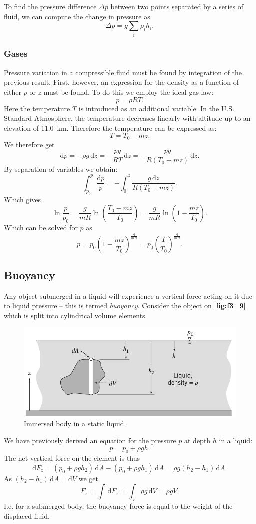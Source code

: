 To find the pressure difference $\Delta p$ between two points separated by a series of fluid, we can compute the change in pressure as
\[ 
\Delta p = g \sum_{i} \rho_i h_i 
.\]

\subsubsection{Gases}
Pressure variation in a compressible fluid must be found by integration of the previous result. First, however, an expression for the density as a function of either $p$ or $z$ must be found. To do this we employ the ideal gas law:
\[ 
p = \rho R T
.\]
Here the temperature $T$ is introduced as an additional variable. In the U.S. Standard Atmosphere, the temperature decreases linearly with altitude up to an elevation of \qty{11,0}{km}. Therefore the temperature can be expressed as:
\[ 
T = T_0 - mz
.\]
We therefore get
\[ 
\mathrm{d}p = - \rho g \, \mathrm{d}z = - \frac{pg}{RT} \, \mathrm{d}z = - \frac{pg}{R \left( T_0 - mz \right)} \, \mathrm{d}z
.\]
By separation of variables we obtain:
\[ 
\int_{p_0}^{p} \frac{\mathrm{d}p}{p}= - \int_{0}^{z} \frac{g \, \mathrm{d}z}{R \left( T_0 - mz \right)}
.\]
Which gives
\[ 
\ln \frac{p}{p_0} = \frac{g}{mR} \ln \left(  \frac{T_0 - mz}{T_0} \right) = \frac{g}{mR} \ln \left( 1 - \frac{mz}{T_0} \right)
.\]
Which can be solved for $p$ as
\[ 
p = p_0 \left( 1 - \frac{mz}{T_0} \right)^{\frac{g}{mR}} = p_0 \left( \frac{T}{T_0} \right)^{\frac{g}{mR}}
.\]

\subsection{Buoyancy}
Any object submerged in a liquid will experience a vertical force acting on it due to liquid pressure -- this is termed \textit{buoyancy}. Consider the object on \textbf{\autoref{fig:f3_9}} which is split into cylindrical volume elements.

\begin{figure} [ht]
  \centering
  \includegraphics[width=0.5\linewidth]{./figures/f3_9.png}
  \caption{Immersed body in a static liquid.}
  \label{fig:f3_9}
\end{figure}

We have previously derived an equation for the pressure $p$ at depth $h$ in a liquid:
\[ 
p = p_0 + \rho gh
.\]
The net vertical force on the element is thus
\[ 
\mathrm{d}F_z = \left( p_0 + \rho gh_2 \right) \, \mathrm{d}A - \left( p_0 + \rho gh_1 \right) \, \mathrm{d}A = \rho g \left( h_2 - h_1 \right) \, \mathrm{d}A
.\]
As $\left( h_2 -  h_1 \right) \, \mathrm{d}A = \mathrm{d}V$ we get
\[ 
F_z = \int \, \mathrm{d}F_z = \int_{V} \rho g \, \mathrm{d}V = \rho g V
.\]
I.e. for a submerged body, the buoyancy force is equal to the weight of the displaced fluid. 
